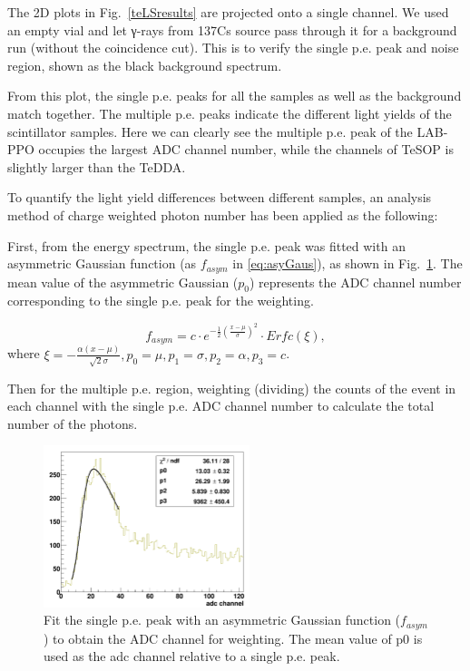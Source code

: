The 2D plots in Fig.~\ref{teLSresults} are projected onto a single channel. We used an empty vial and let γ-rays from 137Cs source pass through it for a background run (without the coincidence cut). This is to verify the single p.e. peak and noise region, shown as the black background spectrum.

From this plot, the single p.e. peaks for all the samples as well as the background match together. The multiple p.e. peaks indicate the different light yields of the scintillator samples. Here we can clearly see the multiple p.e. peak of the LAB-PPO occupies the largest ADC channel number, while the channels of TeSOP is slightly larger than the TeDDA. 

To quantify the light yield differences between different samples, an analysis method of charge weighted photon number has been applied as the following:

First, from the energy spectrum, the single p.e. peak was fitted with an asymmetric Gaussian function (as $f_{asym}$ in \ref{eq:asyGaus}), as shown in Fig.~\ref{fitSinglePE}. The mean value of the asymmetric Gaussian ($p_0$) represents the ADC channel number corresponding to the single p.e. peak for the weighting. 

\begin{equation}\label{eq:asyGaus}
f_{asym}=c\cdot e^{-\frac{1}{2}(\frac{x-\mu}{\sigma})^2}\cdot Erfc(\xi),
\end{equation}
where $\xi=-\frac{\alpha(x-\mu)}{\sqrt 2\sigma},p_0=\mu,p_1=\sigma,p_2=\alpha, p_3=c$.

Then for the multiple p.e. region, weighting (dividing) the counts of the event in each channel with the single p.e. ADC channel number to calculate the total number of the photons.

\begin{figure}[htbp]
	\centering	
	\includegraphics[width=6cm]{fitSinglePE.png}
	\caption{Fit the single p.e. peak with an asymmetric Gaussian function ($f_{asym}$) to obtain the ADC channel for weighting. The mean value of p0 is used as the adc channel relative to a single p.e. peak.}
	\label{fitSinglePE}
\end{figure}

